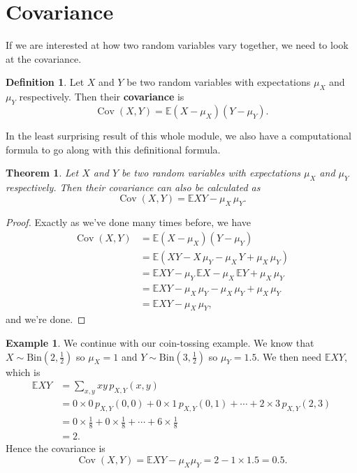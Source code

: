 \documentclass[
  a4paper,
]{book}
\newtheorem{theorem}{Theorem}[chapter]
\theoremstyle{definition}
\newtheorem{definition}{Definition}[chapter]
\theoremstyle{definition}
\newtheorem{example}{Example}[chapter]
\theoremstyle{definition}
\theoremstyle{definition}
\theoremstyle{remark}
\begin{document}
\hypertarget{covariance}{%
\section{Covariance}\label{covariance}}

If we are interested at how two random variables vary together, we need to look at the covariance.

\newcommand{\Cov}{\operatorname{Cov}}
\newcommand{\Corr}{\operatorname{Corr}}

\begin{definition}
Let \(X\) and \(Y\) be two random variables with expectations \(\mu_X\) and \(\mu_Y\) respectively. Then their \textbf{covariance} is
\[ \operatorname{Cov}(X,Y) = \mathbb E(X - \mu_X)(Y - \mu_Y) . \]
\end{definition}

In the least surprising result of this whole module, we also have a computational formula to go along with this definitional formula.

\begin{theorem}
Let \(X\) and \(Y\) be two random variables with expectations \(\mu_X\) and \(\mu_Y\) respectively. Then their covariance can also be calculated as
\[ \operatorname{Cov}(X,Y) = \mathbb EXY - \mu_X\, \mu_Y . \]
\end{theorem}

\begin{proof}
Exactly as we've done many times before, we have
\begin{align*}
\operatorname{Cov}(X,Y) &= \mathbb E(X - \mu_X)(Y - \mu_Y) \\
&= \mathbb E(XY - X\,\mu_Y - \mu_X\, Y + \mu_X\,\mu_Y) \\
&= \mathbb EXY  - \mu_Y \,\mathbb EX - \mu_X \,\mathbb EY + \mu_X \, \mu_Y \\
&= \mathbb EXY - \mu_X \, \mu_Y - \mu_X \, \mu_Y + \mu_X \, \mu_Y \\
&= \mathbb EXY - \mu_X \, \mu_Y ,
\end{align*}
and we're done.
\end{proof}

\begin{example}
We continue with our coin-tossing example. We know that \(X \sim \text{Bin}(2, \frac12)\) so \(\mu_X = 1\) and \(Y \sim \text{Bin}(3, \frac12)\) so \(\mu_Y = 1.5\). We then need \(\mathbb EXY\), which is
\begin{align*}
\mathbb EXY &= \sum_{x,y} xy\, p_{X,Y}(x,y) \\
  &= 0\times 0\,p_{X,Y}(0,0) + 0 \times 1 \, p_{X,Y}(0,1) + \cdots + 2\times 3 \,p_{X,Y}(2,3) \\
  &= 0 \times \tfrac18 + 0 \times \tfrac18 + \cdots + 6 \times \tfrac18 \\
  &= 2.
\end{align*}
Hence the covariance is
\[ \operatorname{Cov}(X,Y) = \mathbb EXY - \mu_X\mu_Y = 2 - 1 \times 1.5 = 0.5 .\]
\end{example}
\end{document}
